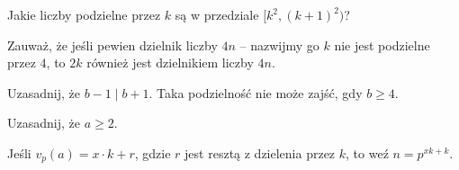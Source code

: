 
\begin{hints_list}
	\item Jakie liczby podzielne przez $k$ są w przedziale $[k^2, (k + 1)^2)$?
	\item *
	\item Zauważ, że jeśli pewien dzielnik liczby $4n$ -- nazwijmy go $k$ nie jest podzielne przez $4$, to $2k$ również jest dzielnikiem liczby $4n$.
	\item Uzasadnij, że $b - 1\mid b + 1$. Taka podzielność nie może zajść, gdy $b \geqslant 4$.
	\item Uzasadnij, że $a \geqslant 2$.
	\item Jeśli $v_p(a) = x \cdot k + r$, gdzie $r$ jest resztą z dzielenia przez $k$, to weź $n = p^{xk + k}$.
\end{hints_list}